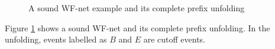 \documentclass{llncs}
\begin{document}
\begin{figure}[ht]
\centering
{}
\caption{A sound WF-net example and its complete prefix unfolding\label{fig:examplePetriAndCpu}}
\end{figure}

\begin{example}\label{ex:petriAndCpu}
Figure \ref{fig:examplePetriAndCpu} shows a sound WF-net and its complete prefix unfolding. In the unfolding, events labelled as $B$ and $E$ are cutoff events.
\end{example}
\end{document}
